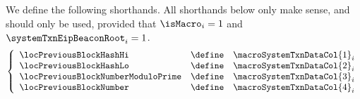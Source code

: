 We define the following shorthands.
All shorthands below only make sense, and should only be used, provided that
$\isMacro                _{i} = 1$ and
$\systemTxnEipBeaconRoot _{i} = 1$.
\[
	\left\{ \begin{array}{lcl}
		\locPreviousBlockHashHi            & \define & \macroSystemTxnDataCol {1} _{i} \\
		\locPreviousBlockHashLo            & \define & \macroSystemTxnDataCol {2} _{i} \\
		\locPreviousBlockNumberModuloPrime & \define & \macroSystemTxnDataCol {3} _{i} \\
		\locPreviousBlockNumber            & \define & \macroSystemTxnDataCol {4} _{i} \\
	\end{array} \right.
\]
